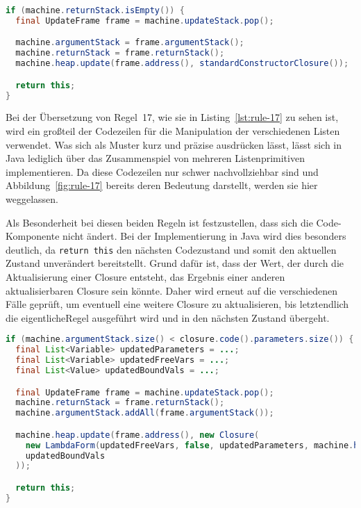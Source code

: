 \begin{lstlisting}[language=java, caption={Implementierung der Erkennung von Aktualisierungen bei Konstruktoren}, label={lst:rule-16}]
if (machine.returnStack.isEmpty()) {
  final UpdateFrame frame = machine.updateStack.pop();

  machine.argumentStack = frame.argumentStack();
  machine.returnStack = frame.returnStack();
  machine.heap.update(frame.address(), standardConstructorClosure());

  return this;
}
\end{lstlisting}

Bei der Übersetzung von Regel~17, wie sie in Listing~\ref{lst:rule-17} zu sehen ist, wird ein großteil der Codezeilen für die Manipulation der verschiedenen Listen verwendet.
Was sich als Muster kurz und präzise ausdrücken lässt, lässt sich in Java lediglich über das Zusammenspiel von mehreren Listenprimitiven implementieren.
Da diese Codezeilen nur schwer nachvollziehbar sind und Abbildung~\ref{fig:rule-17} bereits deren Bedeutung darstellt, werden sie hier weggelassen.

Als Besonderheit bei diesen beiden Regeln ist festzustellen, dass sich die Code-Komponente nicht ändert.
Bei der Implementierung in Java wird dies besonders deutlich, da \texttt{return this} den nächsten Codezustand und somit den aktuellen Zustand unverändert bereitstellt.
Grund dafür ist, dass der Wert, der durch die Aktualisierung einer Closure entsteht, das Ergebnis einer anderen aktualisierbaren Closure sein könnte.
Daher wird erneut auf die verschiedenen Fälle geprüft, um eventuell eine weitere Closure zu aktualisieren, bis letztendlich die eigentlicheRegel ausgeführt wird und in den nächsten Zustand übergeht.


\begin{lstlisting}[language=java, caption={Implementierung der Erkennung von Aktualisierungen bei Funktionen}, label={lst:rule-17}]
if (machine.argumentStack.size() < closure.code().parameters.size()) {
  final List<Variable> updatedParameters = ...;
  final List<Variable> updatedFreeVars = ...;
  final List<Value> updatedBoundVals = ...;

  final UpdateFrame frame = machine.updateStack.pop();
  machine.returnStack = frame.returnStack();
  machine.argumentStack.addAll(frame.argumentStack());

  machine.heap.update(frame.address(), new Closure(
    new LambdaForm(updatedFreeVars, false, updatedParameters, machine.heap.get(frame.address()).code().body),
    updatedBoundVals
  ));

  return this;
}
\end{lstlisting}


